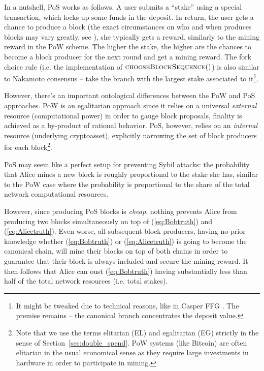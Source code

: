 \documentclass[a4paper]{article}
\begin{document}
   In a nutshell, PoS works as follows. A user submits a ``stake'' using a special transaction, which locks up some funds in the deposit. In return, the user gets a chance to produce a block (the exact circumstances on who and when produces blocks may vary greatly, see \cite{PoSFAQ}), she typically gets a reward, similarly to the mining reward in the PoW scheme. The higher the stake, the higher are the chances to become a block producer for the next round and get a mining reward. The fork choice rule (i.e. the implementation of $\Call{chooseBlockSequence}$) is also similar to Nakamoto consensus --  take the branch with the largest stake associated to it\footnote{It might be tweaked due to technical reasons, like in Casper FFG \cite{CasperFFG}. The premise remains -- the canonical branch concentrates the deposit value. }.

However, there's an important ontological differences between the PoW and PoS approaches. PoW is an egalitarian approach since it relies on a universal \emph{external} resource (computational power) in order to gauge block proposals, finality is achieved as a by-product of rational behavior. PoS, however, relies on an \emph{internal} resource (underlying cryptoasset), explicitly narrowing the set of block producers for each block\footnote{Note that we use the terms elitarian (EL) and egalitarian (EG) strictly in the sense of Section~\ref{sec:double_spend}. PoW systems (like Bitcoin) are often elitarian in the usual economical sense as they require large investments in hardware in order to participate in mining. }.

   PoS may seem like a perfect setup for preventing Sybil attacks: the probability that Alice mines a new block is roughly proportional to the stake she has, similar to the PoW case where the probability is proportional to the share of the total network computational resources. 
   
   
   However, since producing PoS blocks is \emph{cheap}, nothing prevents Alice from producing two blocks simultaneously on top of (\ref{eq:Bobtruth}) and (\ref{eq:Alicetruth}). Even worse, all subsequent block producers, having no prior knowledge whether (\ref{eq:Bobtruth}) or (\ref{eq:Alicetruth}) is going to become the canonical chain, will mine their blocks on top of both chains in order to guarantee that their block is always included and secure the mining reward. It then follows that Alice can oust (\ref{eq:Bobtruth}) having substantially less than half of the total network resources (i.e. total stakes).
   
\end{document}
